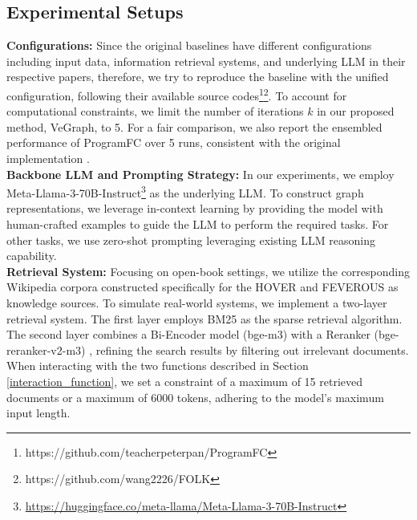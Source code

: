 \documentclass[11pt]{article}
\begin{document}
\subsection{Experimental Setups}
\textbf{Configurations:} Since the original baselines have different configurations including input data, information retrieval systems, and underlying LLM in their respective papers, therefore, we try to reproduce the baseline with the unified configuration, following their available source codes\footnote{https://github.com/teacherpeterpan/ProgramFC}\footnote{https://github.com/wang2226/FOLK}. To account for computational constraints, we limit the number of iterations $k$ in our proposed method, VeGraph, to 5. For a fair comparison, we also report the ensembled performance of ProgramFC over 5 runs, consistent with the original implementation \cite{program_fc}.
\\
\textbf{Backbone LLM and Prompting Strategy:} In our experiments, we employ Meta-Llama-3-70B-Instruct\footnote{\url{https://huggingface.co/meta-llama/Meta-Llama-3-70B-Instruct}} as the underlying LLM. To construct graph representations, we leverage in-context learning by providing the model with human-crafted examples to guide the LLM to perform the required tasks. For other tasks, we use zero-shot prompting leveraging existing LLM reasoning capability.
\\
\textbf{Retrieval System:} Focusing on open-book settings, we utilize the corresponding Wikipedia corpora constructed specifically for the HOVER and FEVEROUS as knowledge sources. To simulate real-world systems, we implement a two-layer retrieval system. The first layer employs BM25 \cite{bm25} as the sparse retrieval algorithm. The second layer combines a Bi-Encoder model (bge-m3) with a Reranker (bge-reranker-v2-m3) \cite{bge-m3}, refining the search results by filtering out irrelevant documents. When interacting with the two functions described in Section \ref{interaction_function}, we set a constraint of a maximum of 15 retrieved documents or a maximum of 6000 tokens, adhering to the model's maximum input length.
\end{document}
